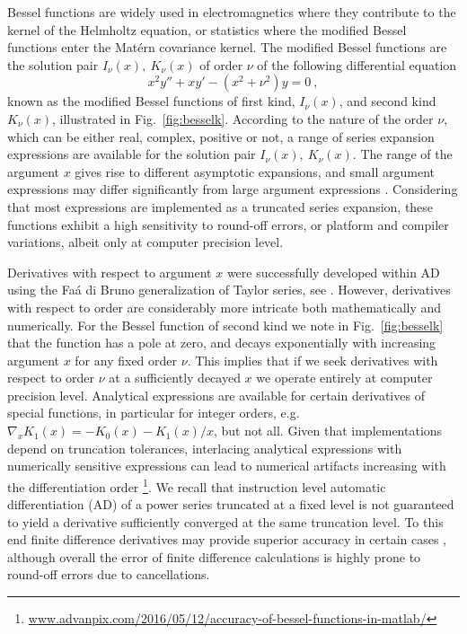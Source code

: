 \documentclass{article}
\begin{document}
Bessel functions are widely used in electromagnetics where they contribute to the kernel of the Helmholtz equation, or statistics where the modified Bessel functions enter the Mat\'ern covariance kernel.
The modified Bessel functions are the solution pair $I_{\nu}(x),\ K_{\nu}(x)$ of order $\nu$ of the following differential equation
$$
x^2 y'' + x y' - \left(x^2 + \nu^2 \right)y = 0\ ,
$$
known as the modified Bessel functions of first kind, $I_{\nu}(x)$, and second kind $K_{\nu}(x)$, illustrated in Fig.~\ref{fig:besselk}. According to the nature of the order $\nu$, which can be either real, complex, positive or not, a range of series expansion expressions are available for the solution pair $I_{\nu}(x),\ K_{\nu}(x)$. The range of the argument $x$ gives rise to different asymptotic expansions, and small argument expressions \cite{abramowitz65} may differ significantly from large argument expressions \cite{nemes2017}. 
Considering that most expressions are implemented as a truncated series expansion, these functions exhibit a high sensitivity to round-off errors, or platform and compiler variations, albeit only at computer precision level. 

Derivatives with respect to argument $x$ were successfully developed within AD  using the Fa\'a di Bruno generalization of Taylor series, see \cite{charpentier2015, charpentier2018}. However, derivatives with respect to order are considerably more intricate both mathematically and numerically. For the Bessel function of second kind we note in Fig.~\ref{fig:besselk} that the function has a pole at zero, and decays exponentially with increasing argument $x$ for any fixed order $\nu$. This implies that if we seek derivatives with respect to order $\nu$ at a sufficiently decayed $x$ we operate entirely at computer precision level.
Analytical expressions are available for certain derivatives of special functions, in particular for integer orders, e.g. $\nabla_{x} K_1(x)=-K_0(x)-K_1(x)/x$, but not all. Given that implementations depend on truncation tolerances, interlacing analytical expressions with numerically sensitive expressions can lead to numerical artifacts increasing with the differentiation order \footnote{\url{www.advanpix.com/2016/05/12/accuracy-of-bessel-functions-in-matlab/}}.
We recall that instruction level automatic differentiation (AD) of a power series truncated at a fixed level is not guaranteed to yield a derivative sufficiently converged at the same truncation level. To this end finite difference derivatives may provide superior accuracy in certain cases \cite{more2014}, although overall the error of finite difference calculations is highly prone to round-off errors due to cancellations. 
\end{document}
